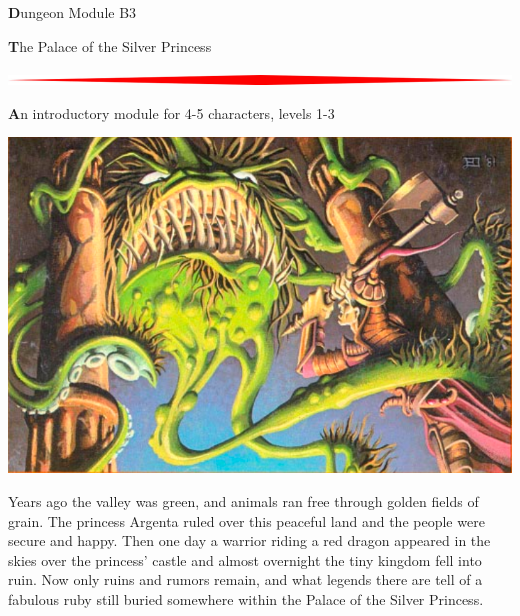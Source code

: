 \documentclass[10pt,twoside,twocolumn]{article}
\begin{document}
\selectfont %



\begin{titlepage}  \begin{onecolumn}
\begin{center}
	{\Huge \textbf Dungeon Module B3}

	{\Huge \textbf The Palace of the Silver Princess}
	
	\vspace{0.5cm}
	\includegraphics[width=\textwidth]{img/hr.jpg}
	
	\vspace{0.5cm}
	{\Large \textbf An introductory module for 4-5 characters, levels 1-3}
	
	\vspace{0.5cm}
	\includegraphics[width=\textwidth]{img/cover.png}
	
	\vspace{0.5cm}
	Years ago the valley was green, and animals ran free through golden
	fields of grain. The princess Argenta ruled over this peaceful land
	and the people were secure and happy. Then one day a warrior riding
	a red dragon appeared in the skies over the princess’ castle and
	almost overnight the tiny kingdom fell into ruin. Now only ruins and
	rumors remain, and what legends there are tell of a fabulous ruby
	still buried somewhere within the Palace of the Silver Princess.


\end{center}
\end{onecolumn}
\end{titlepage}
\end{document}
